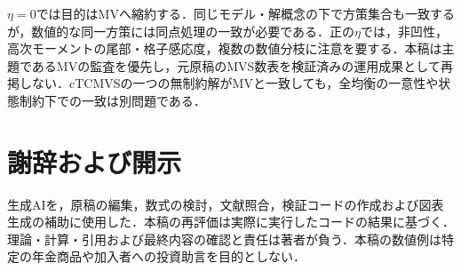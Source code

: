 \documentclass[10pt,a4paper]{article}
\numberwithin{equation}{section}
\numberwithin{table}{section}
\numberwithin{figure}{section}
\theoremstyle{plain}
\theoremstyle{definition}
\begin{document}
$\eta=0$では目的はMVへ縮約する．同じモデル・解概念の下で方策集合も一致するが，数値的な同一方策には同点処理の一致が必要である．正の$\eta$では，非凹性，高次モーメントの尾部・格子感応度，複数の数値分枝に注意を要する．本稿は主題であるMVの監査を優先し，元原稿のMVS数表を検証済みの運用成果として再掲しない．cTCMVSの一つの無制約解がMVと一致しても，全均衡の一意性や状態制約下での一致は別問題である．

\section*{謝辞および開示}
生成AIを，原稿の編集，数式の検討，文献照合，検証コードの作成および図表生成の補助に使用した．本稿の再評価は実際に実行したコードの結果に基づく．理論・計算・引用および最終内容の確認と責任は著者が負う．本稿の数値例は特定の年金商品や加入者への投資助言を目的としない．
\end{document}
